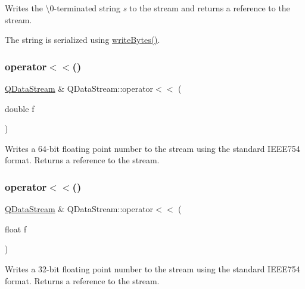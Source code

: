 Writes the \textquotesingle{}\textbackslash{}0\textquotesingle{}-\/terminated string {\itshape s} to the stream and returns a reference to the stream.

The string is serialized using \mbox{\hyperlink{class_q_data_stream_a8f1af77d483ecfd515c9eac3822aaaa5}{write\+Bytes()}}. \mbox{\label{class_q_data_stream_a61587be69fdaa840c4d42eb592c79af2}} 
\subsubsection{\texorpdfstring{operator$<$$<$()}{operator<<()}\hspace{0.1cm}{\footnotesize\ttfamily [2/11]}}
{\footnotesize\ttfamily \mbox{\hyperlink{class_q_data_stream}{Q\+Data\+Stream}} \& Q\+Data\+Stream\+::operator$<$$<$ (\begin{DoxyParamCaption}\item[{double}]{f }\end{DoxyParamCaption})}

Writes a 64-\/bit floating point number to the stream using the standard I\+E\+E\+E754 format. Returns a reference to the stream. \mbox{\label{class_q_data_stream_ac4e26950daf4c0f894d6b3e709b7ec58}} 
\subsubsection{\texorpdfstring{operator$<$$<$()}{operator<<()}\hspace{0.1cm}{\footnotesize\ttfamily [3/11]}}
{\footnotesize\ttfamily \mbox{\hyperlink{class_q_data_stream}{Q\+Data\+Stream}} \& Q\+Data\+Stream\+::operator$<$$<$ (\begin{DoxyParamCaption}\item[{float}]{f }\end{DoxyParamCaption})}

Writes a 32-\/bit floating point number to the stream using the standard I\+E\+E\+E754 format. Returns a reference to the stream. \mbox{\label{class_q_data_stream_a3e9c6b46679fd2c4f329f583bf71ae54}} 
